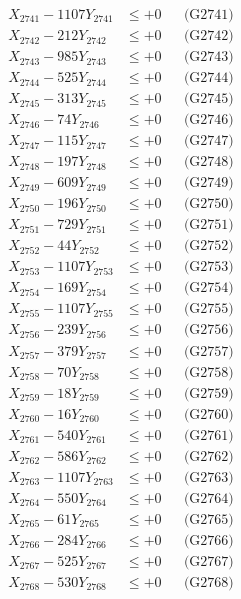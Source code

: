 \documentclass[a4paper,10pt]{article}
\begin{document}
{\begin{align}
\allowbreak
X_{2741} - 1107Y_{2741} &\leq +0 && \text{(G2741)} \\
X_{2742} - 212Y_{2742} &\leq +0 && \text{(G2742)} \\
X_{2743} - 985Y_{2743} &\leq +0 && \text{(G2743)} \\
X_{2744} - 525Y_{2744} &\leq +0 && \text{(G2744)} \\
X_{2745} - 313Y_{2745} &\leq +0 && \text{(G2745)} \\
X_{2746} - 74Y_{2746} &\leq +0 && \text{(G2746)} \\
X_{2747} - 115Y_{2747} &\leq +0 && \text{(G2747)} \\
X_{2748} - 197Y_{2748} &\leq +0 && \text{(G2748)} \\
X_{2749} - 609Y_{2749} &\leq +0 && \text{(G2749)} \\
X_{2750} - 196Y_{2750} &\leq +0 && \text{(G2750)} \\
\allowbreak
X_{2751} - 729Y_{2751} &\leq +0 && \text{(G2751)} \\
X_{2752} - 44Y_{2752} &\leq +0 && \text{(G2752)} \\
X_{2753} - 1107Y_{2753} &\leq +0 && \text{(G2753)} \\
X_{2754} - 169Y_{2754} &\leq +0 && \text{(G2754)} \\
X_{2755} - 1107Y_{2755} &\leq +0 && \text{(G2755)} \\
X_{2756} - 239Y_{2756} &\leq +0 && \text{(G2756)} \\
X_{2757} - 379Y_{2757} &\leq +0 && \text{(G2757)} \\
X_{2758} - 70Y_{2758} &\leq +0 && \text{(G2758)} \\
X_{2759} - 18Y_{2759} &\leq +0 && \text{(G2759)} \\
X_{2760} - 16Y_{2760} &\leq +0 && \text{(G2760)} \\
\allowbreak
X_{2761} - 540Y_{2761} &\leq +0 && \text{(G2761)} \\
X_{2762} - 586Y_{2762} &\leq +0 && \text{(G2762)} \\
X_{2763} - 1107Y_{2763} &\leq +0 && \text{(G2763)} \\
X_{2764} - 550Y_{2764} &\leq +0 && \text{(G2764)} \\
X_{2765} - 61Y_{2765} &\leq +0 && \text{(G2765)} \\
X_{2766} - 284Y_{2766} &\leq +0 && \text{(G2766)} \\
X_{2767} - 525Y_{2767} &\leq +0 && \text{(G2767)} \\
X_{2768} - 530Y_{2768} &\leq +0 && \text{(G2768)} \\

\end{align}}
\end{document}
